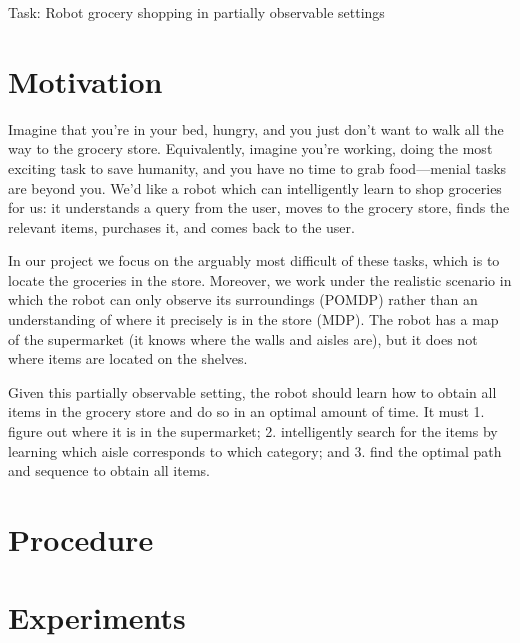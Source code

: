 \documentclass{pset}
\begin{document}

\begin{center}
\Large Task: Robot grocery shopping in partially observable settings
\end{center}
\section{Motivation}
\label{sec:motivation}
Imagine that you're in your bed, hungry, and you just don't want to walk
all the way to the grocery store. Equivalently, imagine you're working, doing the
most exciting task to save humanity, and you have no time to grab food---menial
tasks are beyond you. We'd like a robot which can intelligently learn to shop
groceries for us: it understands a query from the user, moves to the
grocery store, finds the relevant items, purchases it, and comes
back to the user.

In our project we focus on the arguably most difficult of
these tasks, which is to locate the groceries in the store. Moreover, we work
under the realistic
scenario in which the robot can only observe its surroundings (POMDP) rather
than an understanding of where it precisely is in the store (MDP).
The robot has a map of the supermarket (it knows where the walls and aisles are), but 
it does not where items are located on the shelves. 

Given this partially observable setting, the robot should learn how to obtain
all items in the grocery store and do so in an optimal amount of time. It must
1. figure out where it is in the supermarket;
2. intelligently search for the items by learning which aisle corresponds to
which category; and 3. find the optimal path and sequence to obtain all items.

\section{Procedure}
\label{sec:procedure}

\section{Experiments}
\label{sec:experiments}




\end{document}
